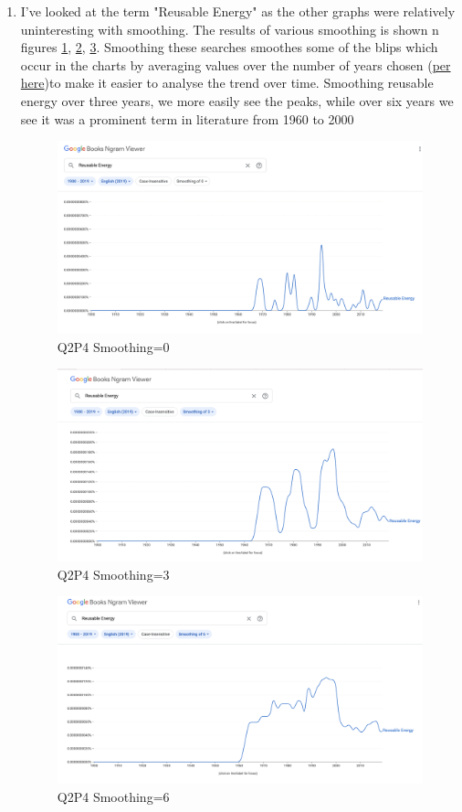 \documentclass{article}
\begin{document}
\begin{enumerate}
\item I've looked at the term "Reusable Energy" as the other graphs were relatively uninteresting with smoothing. The results of various smoothing is shown n figures \ref{NoSmooth}, \ref{ThreeSmooth}, \ref{SixSmooth}.  Smoothing these searches smoothes some of the blips which occur in the charts by averaging values over the number of years chosen (\href{https://port.sas.ac.uk/mod/book/view.php?id=554&chapterid=328}{per here})to make it easier to analyse the trend over time. Smoothing reusable energy over three years, we more easily see the peaks, while over six years we see it was a prominent term in literature from 1960 to 2000

\begin{figure}[h!]
	\centering
	\includegraphics[width=0.4\linewidth]{re_sm0.png}
	\caption{Q2P4 Smoothing=0}\label{NoSmooth}
\end{figure}
\begin{figure}[h!]
	\centering
	\includegraphics[width=0.4\linewidth]{re_sm3.png}
	\caption{Q2P4 Smoothing=3}\label{ThreeSmooth}
\end{figure}
\begin{figure}[h!]
	\centering
	\includegraphics[width=0.4\linewidth]{re_sm6.png}
	\caption{Q2P4 Smoothing=6}\label{SixSmooth}
\end{figure}

\end{enumerate}
\end{document}
